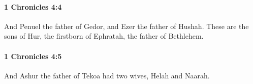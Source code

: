 		\paragraph{1 Chronicles 4:4} %
			\label{1CHRONICLES-4-4}

			And Penuel the father of Gedor, and Ezer the father of Hushah. These are the sons of Hur, the firstborn of Ephratah, the father of Bethlehem.


		\paragraph{1 Chronicles 4:5} %
			\label{1CHRONICLES-4-5}

			And Ashur the father of Tekoa had two wives, Helah and Naarah.


